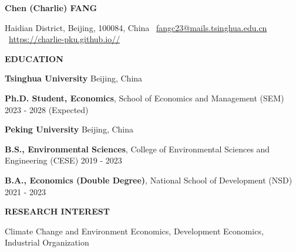 \documentclass[UTF8]{ctexbook}
\begin{document}
\begin{center}
    \textbf{Chen (Charlie) FANG}\\ 
    \hrulefill
\end{center}

\begin{center}
    Haidian District, Beijing, 100084, China \textbullet \ \href{mailto:fangc23@mails.tsinghua.edu.cn}{fangc23@mails.tsinghua.edu.cn} \textbullet \ \href{https://charlie-pku.github.io//}{https://charlie-pku.github.io//}
\end{center}

\vspace{0.5pt}

\begin{center}
    \textbf{EDUCATION}
\end{center}
\textbf{Tsinghua University} \hfill Beijing, China



\quad \textbf{Ph.D. Student, Economics}, School of Economics and Management (SEM) \hfill 2023 - 2028 (Expected)


\vspace{12pt}

\textbf{Peking University}  \hfill Beijing, China

\quad \textbf{B.S., Environmental Sciences}, College of Environmental Sciences and Engineering (CESE) \hfill	2019 - 2023

\quad \textbf{B.A., Economics (Double Degree)}, National School of Development (NSD) \hfill 2021 - 2023

\vspace{12pt}




\begin{center}
    \textbf{RESEARCH INTEREST}
\end{center}

Climate Change and Environment Economics, Development Economics, Industrial Organization

\vspace{12pt}
\end{document}
